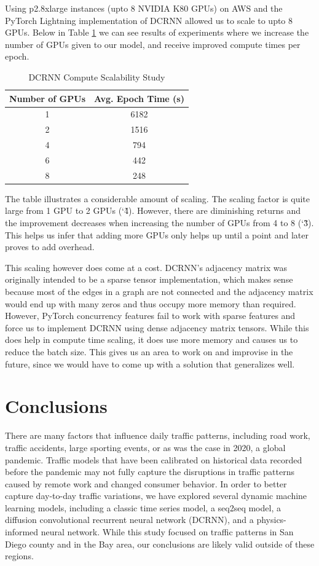 \documentclass{article}
\begin{document}
Using p2.8xlarge instances (upto 8 NVIDIA K80 GPUs) on AWS and the PyTorch Lightning implementation of DCRNN allowed us to scale to upto 8 GPUs. Below in Table \ref{tab:compute-scale} we can see results of experiments where we increase the number of GPUs given to our model, and receive improved compute times per epoch.

\begin{table}[hbt!]
	\caption{DCRNN Compute Scalability Study}
	\centering
	\begin{tabular}{cc}
		\toprule
		Number of GPUs  & Avg. Epoch Time (s) \\
		\midrule
		1               & 6182 \\
		2               & 1516 \\
		4               & 794 \\
		6               & 442 \\
		8               & 248 \\
		\bottomrule
	\end{tabular}
	\label{tab:compute-scale}
\end{table}

The table illustrates a considerable amount of scaling. The scaling factor is quite large from 1 GPU to 2 GPUs (\char`\~4). However, there are diminishing returns and the improvement decreases when increasing the number of GPUs from 4 to 8 (\char`\~3). This helps us infer that adding more GPUs only helps up until a point and later proves to add overhead. 

This scaling however does come at a cost. DCRNN’s adjacency matrix was originally intended to be a sparse tensor implementation, which makes sense because most of the edges in a graph are not connected and the adjacency matrix would end up with many zeros and thus occupy more memory than required. However, PyTorch concurrency features fail to work with sparse features and force us to implement DCRNN using dense adjacency matrix tensors. While this does help in compute time scaling, it does use more memory and causes us to reduce the batch size. This gives us an area to work on and improvise in the future, since we would have to come up with a solution that generalizes well.

\section{Conclusions}

There are many factors that influence daily traffic patterns, including road work, traffic accidents, large sporting events, or as was the case in 2020, a global pandemic.
Traffic models that have been calibrated on historical data recorded before the pandemic may not fully capture the disruptions in traffic patterns caused by remote work and changed consumer behavior.
In order to better capture day-to-day traffic variations,
we have explored several dynamic machine learning models, including a classic time series model,
a seq2seq model, a diffusion convolutional recurrent neural network (DCRNN), and a 
physics-informed neural network.
While this study focused on traffic patterns in San Diego county and in the Bay area, our conclusions are
likely valid outside of these regions.
\end{document}
